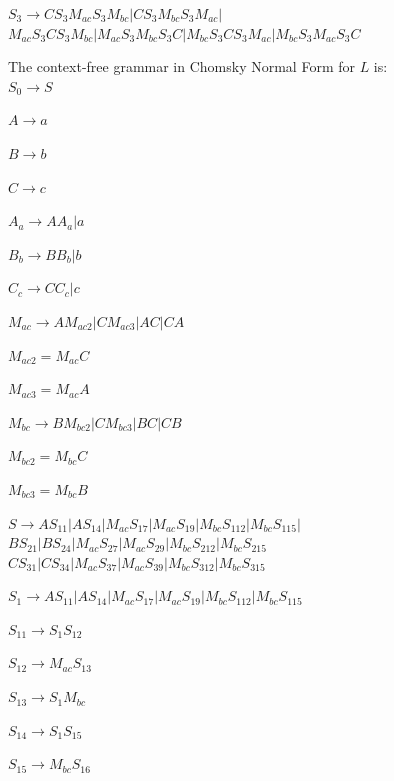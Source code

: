 \documentclass{article}%
\begin{document}
\begin{enumerate}
\begin{enumerate}
	$S_3 \rightarrow C S_3 M_{ac}S_3M_{bc}| C S_3 M_{bc}S_3M_{ac} | $ \\ 
	$M_{ac} S_3 C S_3 M_{bc} |M_{ac} S_3 M_{bc} S_3 C| M_{bc} S_3 C S_3 M_{ac} |M_{bc} S_3 M_{ac} S_3 C  $
	
	  The context-free grammar in Chomsky Normal Form for $L$ is: \\
	  
	  $S_0 \rightarrow S$
	  
	  $A \rightarrow a$
	  
	  $B \rightarrow b$
	  	  
	  $C \rightarrow c$
	  
	  $A_a \rightarrow AA_a | a$
	  
	  $B_b \rightarrow BB_b | b$
	  
 	  $C_c \rightarrow CC_c | c$	  
 	  
 	  $M_{ac} \rightarrow AM_{ac2} | CM_{ac3} | AC|CA$ 
 	  
 	  $M_{ac2} = M_{ac}C$
 	  
 	  $M_{ac3} = M_{ac}A$
	
	$M_{bc} \rightarrow BM_{bc2} | CM_{bc3} | BC|CB$ 
	
	$M_{bc2} = M_{bc}C$
 	  
 	  $M_{bc3} = M_{bc}B$
 	  
 	  $S \rightarrow A S_{11} | A S_{14} | M_{ac}S_{17} | M_{ac}S_{19} | M_{bc}S_{112} | M_{bc}S_{115} | $ \\
 	  $B S_{21} | B S_{24} | M_{ac}S_{27} | M_{ac}S_{29} | M_{bc}S_{212} | M_{bc}S_{215}$ \\
 	   $C S_{31} | C S_{34} | M_{ac}S_{37} | M_{ac}S_{39} | M_{bc}S_{312} | M_{bc}S_{315}$ 
 	  
 	  
	
	
	$S_1 \rightarrow A S_{11} | A S_{14} | M_{ac}S_{17} | M_{ac}S_{19} | M_{bc}S_{112} | M_{bc}S_{115}$
	
	$S_{11} \rightarrow S_1S_{12}$
	
	$S_{12} \rightarrow M_{ac}S_{13}$
	
	$S_{13} \rightarrow S_1M_{bc}$
	
	$S_{14} \rightarrow S_1S_{15}$
	
	$S_{15} \rightarrow M_{bc}S_{16}$
	

\end{enumerate}
\end{enumerate}
\end{document}
